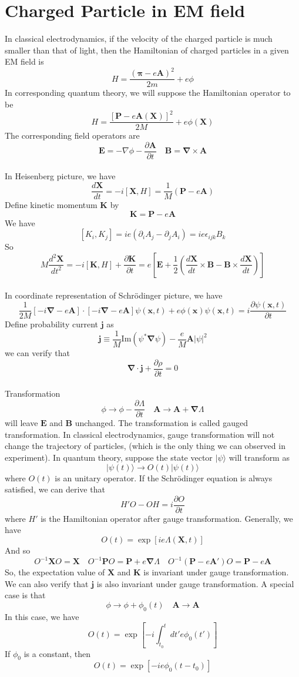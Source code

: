 \documentclass[cyan]{elegantnote}
\begin{document}
\section{Charged Particle in EM field}
In classical electrodynamics, if the velocity of the charged particle is much smaller than that of light, then the Hamiltonian of charged particles in a given EM field is
\[H = \frac{(\bm{\pi}-e\bm{A})^2}{2m} + e\phi\]
In corresponding quantum theory, we will suppose the Hamiltonian operator to be
\[H = \frac{[\bm{P}-e\bm{A}(\bm{X})]^2}{2M} + e\phi(\bm{X})\]
The corresponding field operators are
\[\bm{E} = -\nabla\phi - \frac{\partial \bm{A}}{\partial t} \quad \bm{B} = \bm{\nabla}\times\bm{A}\]\\
In Heisenberg picture, we have
\[\frac{d\bm{X}}{dt} = -i[\bm{X},H] = \frac{1}{M}(\bm{P}-e\bm{A})\]
Define kinetic momentum $\bm{K}$ by
\[\bm{K} = \bm{P}-e\bm{A}\]
We have
\[[K_i,K_j] = ie(\partial_i A_j-\partial_j A_i) = ie\epsilon_{ijk}B_k\]
So
\[M \frac{d^2\bm{X}}{dt^2} = -i[\bm{K},H] + \frac{\partial \bm{K}}{\partial t} = e \left[ \bm{E}+ \frac{1}{2} \left( \frac{d\bm{X}}{dt} \times \bm{B} - \bm{B}\times\frac{d\bm{X}}{dt} \right) \right]\]\\
In coordinate representation of Schrödinger picture, we have
\[\frac{1}{2M} \left[ -i\bm{\nabla}-e\bm{A} \right] \cdot \left[ -i\bm{\nabla}-e\bm{A} \right] \psi(\bm{x},t) + e\phi(\bm{x})\psi(\bm{x},t) = i \frac{\partial \psi(\bm{x},t)}{\partial t}\]
Define probability current $\bm{j}$ as
\[\bm{j} \equiv \frac{1}{M} \mathrm{Im}(\psi^{*}\bm{\nabla}\psi) - \frac{e}{M}\bm{A}|\psi|^2\]
we can verify that
\[\bm{\nabla}\cdot\bm{j} + \frac{\partial \rho}{\partial t} = 0\]\\
Transformation
\[\phi \to \phi - \frac{\partial \Lambda}{\partial t} \quad \bm{A} \to \bm{A} + \bm{\nabla}\Lambda\]
will leave $\bm{E}$ and $\bm{B}$ unchanged. The transformation is called gauged transformation. In classical electrodynamics, gauge transformation will not change the trajectory of particles, (which is the only thing we can observed in experiment). In quantum theory, suppose the state vector $|\psi\rangle$ will transform as 
\[|\psi(t)\rangle \to O(t)|\psi(t)\rangle\]
where $O(t)$ is an unitary operator. If the Schrödinger equation is always satisfied, we can derive that
\[H'O - OH = i\frac{\partial O}{\partial t}\]
where $H'$ is the Hamiltonian operator after gauge transformation. Generally, we have
\[O(t) = \exp \left[ ie\Lambda(\bm{X},t)\right]\]
And so
\[O^{-1} \bm{X} O = \bm{X} \quad O^{-1} \bm{P} O = \bm{P} + e\bm{\nabla}\Lambda \quad O^{-1}(\bm{P}-e\bm{A}')O = \bm{P} - e\bm{A}\]
So, the expectation value of $\bm{X}$ and $\bm{K}$ is invariant under gauge transformation. We can also verify that $\bm{j}$ is also invariant under gauge transformation.
A special case is that
\[\phi \to \phi+\phi_0(t) \quad \bm{A} \to \bm{A}\]
In this case, we have
\[O(t) = \exp \left[ -i \int_{t_0}^{t} dt' e\phi_0(t') \right]\]
If $\phi_0$ is a constant, then
\[O(t) = \exp \left[ -ie\phi_0(t-t_0) \right]\]
\end{document}
